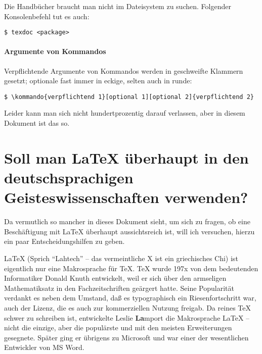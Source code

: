 \documentclass[11pt,table]{scrreprt}
\begin{document}
Die Handbücher braucht man nicht im Dateisystem zu suchen. Folgender Konsolenbefehl tut es auch:
\begin{lstlisting}
$ texdoc <package>
\end{lstlisting}

\paragraph{Argumente von Kommandos}
Verpflichtende Argumente von Kommandos werden in geschweifte Klammern gesetzt; optionale fast immer in eckige, selten auch in runde:
\begin{lstlisting}
$ \kommando{verpflichtend 1}[optional 1][optional 2]{verpflichtend 2}
\end{lstlisting}
Leider kann man sich nicht hundertprozentig darauf verlassen, aber in diesem Dokument ist das so.

\section{Soll man \LaTeX{} überhaupt in den deutschsprachigen Geisteswissenschaften verwenden?}

Da vermutlich so mancher in dieses Dokument sieht, um sich zu fragen, ob eine Beschäftigung mit \LaTeX{} überhaupt aussichtsreich ist, will ich versuchen, hierzu ein paar Entscheidungshilfen zu geben.

\LaTeX{} (Sprich \enquote{Lahtech} -- das vermeintliche X ist ein griechisches Chi) ist eigentlich nur eine Makrosprache für \TeX{}. \TeX{} wurde 197x von dem bedeutenden Informatiker Donald Knuth entwickelt, weil er sich über den armseligen Mathematiksatz in den Fachzeitschriften geärgert hatte. Seine Popularität verdankt es neben dem Umstand, daß es typographisch ein Riesenfortschritt war, auch der Lizenz, die es auch zur kommerziellen Nutzung freigab. Da reines \TeX{} schwer zu schreiben ist, entwickelte Leslie \textbf{La}mport die Makrosprache \LaTeX{} -- nicht die einzige, aber die populärste und mit den meisten Erweiterungen gesegnete. Später ging er übrigens zu Microsoft und war einer der wesentlichen Entwickler von MS Word.
\end{document}
